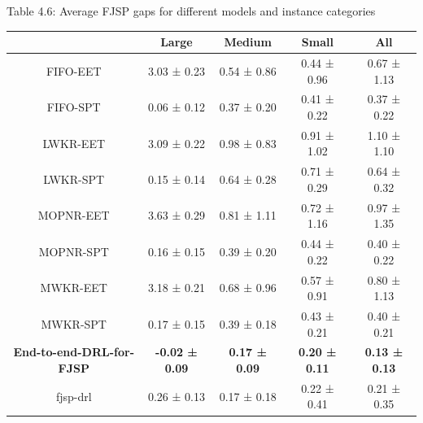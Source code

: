 \begin{table}
    Table 4.6: Average FJSP gaps for different models and instance categories\\
    \vspace{1mm}
    \label{table:4.4}
    \footnotesize 
    \begin{tabular}{ccccc}
        \toprule
        & Large & Medium & Small & All \\
        \midrule
        FIFO-EET & 3.03 ± 0.23 & 0.54 ± 0.86 & 0.44 ± 0.96 & 0.67 ± 1.13 \\
        FIFO-SPT & 0.06 ± 0.12 & 0.37 ± 0.20 & 0.41 ± 0.22 & 0.37 ± 0.22 \\
        LWKR-EET & 3.09 ± 0.22 & 0.98 ± 0.83 & 0.91 ± 1.02 & 1.10 ± 1.10 \\
        LWKR-SPT & 0.15 ± 0.14 & 0.64 ± 0.28 & 0.71 ± 0.29 & 0.64 ± 0.32 \\
        MOPNR-EET & 3.63 ± 0.29 & 0.81 ± 1.11 & 0.72 ± 1.16 & 0.97 ± 1.35 \\
        MOPNR-SPT & 0.16 ± 0.15 & 0.39 ± 0.20 & 0.44 ± 0.22 & 0.40 ± 0.22 \\
        MWKR-EET & 3.18 ± 0.21 & 0.68 ± 0.96 & 0.57 ± 0.91 & 0.80 ± 1.13 \\
        MWKR-SPT & 0.17 ± 0.15 & 0.39 ± 0.18 & 0.43 ± 0.21 & 0.40 ± 0.21 \\
        \textbf{End-to-end-DRL-for-FJSP} & \textbf{-0.02 ± 0.09} & \textbf{0.17 ± 0.09} & \textbf{0.20 ± 0.11} & \textbf{0.13 ± 0.13} \\
        fjsp-drl & 0.26 ± 0.13 & 0.17 ± 0.18 & 0.22 ± 0.41 & 0.21 ± 0.35 \\
        \bottomrule
    \end{tabular}
\end{table}

